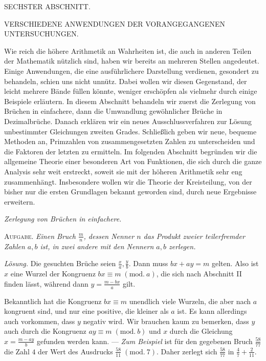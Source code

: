 \clearpage{}
\begin{center}\Large SECHSTER ABSCHNITT.\par\medskip\normalsize VERSCHIEDENE ANWENDUNGEN DER VORANGEGANGENEN UNTERSUCHUNGEN.\end{center}

Wie reich die höhere Arithmetik an Wahrheiten ist, die auch in anderen Teilen der Mathematik nützlich sind, haben wir bereits an mehreren Stellen angedeutet. Einige Anwendungen, die eine ausführlichere Darstellung verdienen, gesondert zu behandeln, schien uns nicht unnütz. Dabei wollen wir diesen Gegenstand, der leicht mehrere Bände füllen könnte, weniger erschöpfen als vielmehr durch einige Beispiele erläutern. In diesem Abschnitt behandeln wir zuerst die Zerlegung von Brüchen in einfachere, dann die Umwandlung gewöhnlicher Brüche in Dezimalbrüche. Danach erklären wir ein neues Ausschlussverfahren zur Lösung unbestimmter Gleichungen zweiten Grades. Schließlich geben wir neue, bequeme Methoden an, Primzahlen von zusammengesetzten Zahlen zu unterscheiden und die Faktoren der letzten zu ermitteln. Im folgenden Abschnitt begründen wir die allgemeine Theorie einer besonderen Art von Funktionen, die sich durch die ganze Analysis sehr weit erstreckt, soweit sie mit der höheren Arithmetik sehr eng zusammenhängt. Insbesondere wollen wir die Theorie der Kreisteilung, von der bisher nur die ersten Grundlagen bekannt geworden sind, durch neue Ergebnisse erweitern.

\begin{center}\textit{Zerlegung von Brüchen in einfachere.}\end{center}

\textsc{Aufgabe.} \textit{Einen Bruch \(\frac mn\), dessen Nenner \(n\) das Produkt zweier teilerfremder Zahlen \(a,b\) ist, in zwei andere mit den Nennern \(a,b\) zerlegen.}

\textit{Lösung.} Die gesuchten Brüche seien \(\frac xa,\frac yb\). Dann muss \(bx+ay=m\) gelten. Also ist \(x\) eine Wurzel der Kongruenz \(bx\equiv m\; (\mathrm{mod}.\ a)\), die sich nach Abschnitt II finden lässt, während dann \(y\)\(=\frac{m-bx}{a}\) gilt.

Bekanntlich hat die Kongruenz \(bx\equiv m\) unendlich viele Wurzeln, die aber nach \(a\) kongruent sind, und nur eine positive, die kleiner als \(a\) ist. Es kann allerdings auch vorkommen, dass \(y\) negativ wird. Wir brauchen kaum zu bemerken, dass \(y\) auch durch die Kongruenz \(ay\equiv m\; (\mathrm{mod}.\ b)\) und \(x\) durch die Gleichung \(x=\frac{m-ay}{b}\) gefunden werden kann. — \textit{Zum Beispiel} ist für den gegebenen Bruch \(\frac{58}{77}\) die Zahl \(4\) der Wert des Ausdrucks \(\frac{58}{11}\; (\mathrm{mod}.\ 7)\). Daher zerlegt sich \(\frac{58}{77}\) in \(\frac47+\frac2{11}\).

